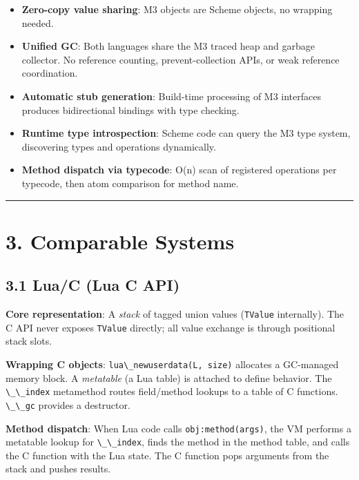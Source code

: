 \documentclass[
  12pt,
]{report}
\newcommand{\passthrough}[1]{#1}
\providecommand{\tightlist}{%
  \setlength{\itemsep}{0pt}\setlength{\parskip}{0pt}}
\begin{document}
\begin{itemize}
\tightlist
\item
  \textbf{Zero-copy value sharing}: M3 objects are Scheme objects, no
  wrapping needed.
\item
  \textbf{Unified GC}: Both languages share the M3 traced heap and
  garbage collector. No reference counting, prevent-collection APIs, or
  weak reference coordination.
\item
  \textbf{Automatic stub generation}: Build-time processing of M3
  interfaces produces bidirectional bindings with type checking.
\item
  \textbf{Runtime type introspection}: Scheme code can query the M3 type
  system, discovering types and operations dynamically.
\item
  \textbf{Method dispatch via typecode}: O(n) scan of registered
  operations per typecode, then atom comparison for method name.
\end{itemize}

\begin{center}\rule{0.5\linewidth}{0.5pt}\end{center}

\section{3. Comparable Systems}\label{comparable-systems}

\subsection{3.1 Lua/C (Lua C API)}\label{luac-lua-c-api}

\textbf{Core representation}: A \emph{stack} of tagged union values
(\passthrough{\lstinline!TValue!} internally). The C API never exposes
\passthrough{\lstinline!TValue!} directly; all value exchange is through
positional stack slots.

\textbf{Wrapping C objects}:
\passthrough{\lstinline!lua\_newuserdata(L, size)!} allocates a
GC-managed memory block. A \emph{metatable} (a Lua table) is attached to
define behavior. The \passthrough{\lstinline!\_\_index!} metamethod
routes field/method lookups to a table of C functions.
\passthrough{\lstinline!\_\_gc!} provides a destructor.

\textbf{Method dispatch}: When Lua code calls
\passthrough{\lstinline!obj:method(args)!}, the VM performs a metatable
lookup for \passthrough{\lstinline!\_\_index!}, finds the method in the
method table, and calls the C function with the Lua state. The C
function pops arguments from the stack and pushes results.
\end{document}

